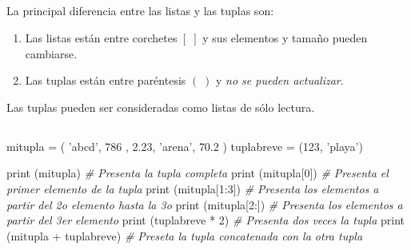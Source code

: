 \documentclass[]{article}
\newenvironment{Shaded}{}{}
\newcommand{\DecValTok}[1]{\textcolor[rgb]{0.25,0.63,0.44}{#1}}
\newcommand{\FloatTok}[1]{\textcolor[rgb]{0.25,0.63,0.44}{#1}}
\newcommand{\StringTok}[1]{\textcolor[rgb]{0.25,0.44,0.63}{#1}}
\newcommand{\CommentTok}[1]{\textcolor[rgb]{0.38,0.63,0.69}{\textit{#1}}}
\newcommand{\OperatorTok}[1]{\textcolor[rgb]{0.40,0.40,0.40}{#1}}
\newcommand{\BuiltInTok}[1]{#1}
\newcommand{\NormalTok}[1]{#1}
\providecommand{\tightlist}{%
  \setlength{\itemsep}{0pt}\setlength{\parskip}{0pt}}
\begin{document}
\subsection{}\label{section-32}

La principal diferencia entre las listas y las tuplas son:

\begin{enumerate}
\def\labelenumi{\arabic{enumi}.}
\tightlist
\item
  Las listas están entre corchetes \([\;]\) y sus elementos y tamaño
  pueden cambiarse.
\item
  Las tuplas están entre paréntesis \((\;)\) y \emph{no se pueden
  actualizar}.
\end{enumerate}

Las tuplas pueden ser consideradas como listas de sólo lectura.

\subsection{}\label{section-33}

\begin{Shaded}
\begin{Highlighting}[]
\NormalTok{mitupla }\OperatorTok{=}\NormalTok{ ( }\StringTok{'abcd'}\NormalTok{, }\DecValTok{786}\NormalTok{ , }\FloatTok{2.23}\NormalTok{, }\StringTok{'arena'}\NormalTok{, }\FloatTok{70.2}\NormalTok{  )}
\NormalTok{tuplabreve }\OperatorTok{=}\NormalTok{ (}\DecValTok{123}\NormalTok{, }\StringTok{'playa'}\NormalTok{)}

\BuiltInTok{print}\NormalTok{ (mitupla)                }\CommentTok{# Presenta la tupla completa}
\BuiltInTok{print}\NormalTok{ (mitupla[}\DecValTok{0}\NormalTok{])             }\CommentTok{# Presenta el primer elemento de la tupla}
\BuiltInTok{print}\NormalTok{ (mitupla[}\DecValTok{1}\NormalTok{:}\DecValTok{3}\NormalTok{])           }\CommentTok{# Presenta los elementos a partir del 2o elemento hasta la 3o}
\BuiltInTok{print}\NormalTok{ (mitupla[}\DecValTok{2}\NormalTok{:])            }\CommentTok{# Presenta los elementos a partir del 3er elemento}
\BuiltInTok{print}\NormalTok{ (tuplabreve }\OperatorTok{*} \DecValTok{2}\NormalTok{)         }\CommentTok{# Presenta dos veces la tupla}
\BuiltInTok{print}\NormalTok{ (mitupla }\OperatorTok{+}\NormalTok{ tuplabreve)   }\CommentTok{# Preseta la tupla concatenada con la otra tupla}
\end{Highlighting}
\end{Shaded}
\end{document}
